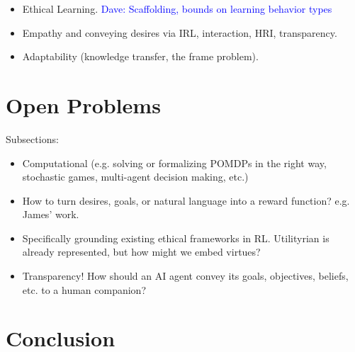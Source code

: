 \documentclass[11pt]{article}
\newcommand\davenote[1]{\textcolor{blue}{Dave: #1}}
\begin{document}
\begin{itemize}
\item Ethical Learning. \davenote{Scaffolding, bounds on learning behavior types}
\item Empathy and conveying desires via IRL, interaction, HRI, transparency.
\item Adaptability (knowledge transfer, the frame problem).
\end{itemize}


\section{Open Problems}

Subsections:
\begin{itemize}
\item Computational (e.g. solving or formalizing POMDPs in the right way, stochastic games, multi-agent decision making, etc.)
\item How to turn desires, goals, or natural language into a reward function? e.g. James' work.
\item Specifically grounding existing ethical frameworks in RL. Utilityrian is already represented, but how might we embed virtues?
\item Transparency! How should an AI agent convey its goals, objectives, beliefs, etc. to a human companion?
\end{itemize}


\section{Conclusion}




\end{document}
